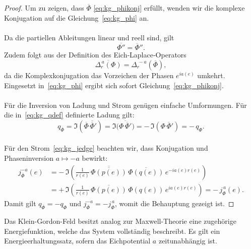 \documentclass[11pt,a4paper,leqno]{report}
\numberwithin{equation}{chapter}
\begin{document}
\begin{proof}
	Um zu zeigen, dass $\overline{\Phi}$ 
	\eqref{eq:kg_phikonj} erfüllt, wenden wir die komplexe Konjugation 
	auf die Gleichung~\eqref{eq:kg_phi} an. \\
	\\
	Da die partiellen Ableitungen linear und reell sind, gilt
	\[
	\overline{\Phi''} 
	= \overline{\Phi}''.
	\]
	Zudem folgt aus der Definition des Eich‑Laplace‑Operators
	\[
	\overline{\Delta_r^{\,a}(\Phi)} 
	= \Delta_r^{\,-a}(\overline{\Phi}),
	\]
	da die Komplexkonjugation das Vorzeichen der Phasen $e^{ia(e)}$ umkehrt. 
	Eingesetzt in~\eqref{eq:kg_phi} ergibt sich sofort Gleichung~\eqref{eq:kg_phikonj}. \\
	\\
	Für die Inversion von Ladung und Strom genügen einfache Umformungen. 
	Für die in~\eqref{eq:kg_qdef} definierte Ladung gilt:
	\begin{equation*}
		q_{\overline{\Phi}}
		=  \Im(\overline{\Phi}\,\overline{\overline{\Phi}}')
		=  \Im\!\bigl(\overline{\Phi\,\overline{\Phi}'}\bigr)
		=  -\,\Im(\Phi\,\overline{\Phi}')
		= -\,q_{\Phi}.
	\end{equation*}
	\\
	Für den Strom~\eqref{eq:kg_jedge} beachten wir, 
	dass Konjugation und Phaseninversion \(a \mapsto -a\) bewirkt:
	\begin{align*}
		j_{\overline{\Phi}}^{-a}(e) 
		&= -\,\Im\!\left(
		\frac{1}{r(e)}\,
		\overline{\overline{\Phi(p(e))}}\,
		\overline{\Phi(q(e))}\,
		e^{-i a(e)r(e)}
		\right) \\[4pt]
		&= +\,\Im\!\left(
		\frac{1}{r(e)}\,
		\overline{\Phi(p(e))}\,
		\Phi(q(e))\,
		e^{i a(e)r(e)} 
		\right)
		= -\,j_{\Phi}^{\,a}(e).
	\end{align*}
	Damit gilt 
	$q_{\overline{\Phi}} = -q_{\Phi}$ 
	und 
	$j_{\overline{\Phi}}^{-a} = -j_{\Phi}^{\,a}$,
	womit die Behauptung gezeigt ist.
\end{proof}
\noindent
Das Klein-Gordon-Feld besitzt analog zur Maxwell-Theorie
eine zugehörige Energiefunktion, welche das System vollständig beschreibt. 
Es gilt ein Energieerhaltungssatz, sofern das Eichpotential $a$ zeitunabhängig ist.
\end{document}
